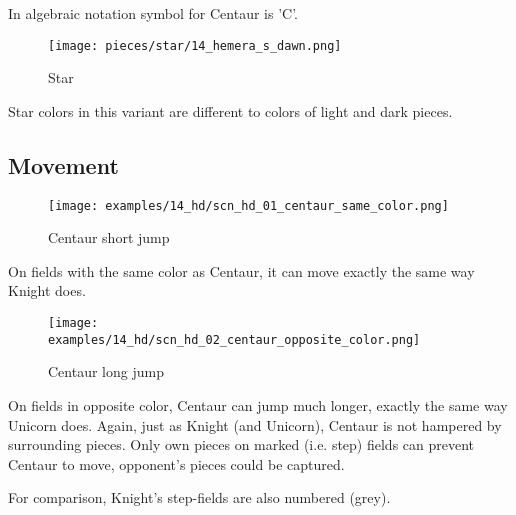 In algebraic notation symbol for Centaur is ’C’.

\noindent
\begin{wrapfigure}{l}{0.4\textwidth}
\centering
\texttt{[image: pieces/star/14\_hemera\_s\_dawn.png]}
\caption{Star}
\label{fig:star/14_hemera_s_dawn}
\end{wrapfigure}
Star colors in this variant are different to colors of light and dark pieces.

\clearpage %

\subsection*{Movement}

\noindent
\begin{wrapfigure}{l}{0.4\textwidth}
\centering
\texttt{[image: examples/14\_hd/scn\_hd\_01\_centaur\_same\_color.png]}
\caption{Centaur short jump}
\label{fig:scn_hd_01_centaur_same_color}
\end{wrapfigure}
On fields with the same color as Centaur, it can move exactly the
same way Knight does.

\clearpage %

\noindent
\begin{figure}[!h]
\texttt{[image: examples/14\_hd/scn\_hd\_02\_centaur\_opposite\_color.png]}
\caption{Centaur long jump}
\label{fig:scn_hd_02_centaur_opposite_color}
\end{figure}

On fields in opposite color, Centaur can jump much longer, exactly the
same way Unicorn does. Again, just as Knight (and Unicorn), Centaur is
not hampered by surrounding pieces. Only own pieces on marked (i.e. step)
fields can prevent Centaur to move, opponent's pieces could be captured.

For comparison, Knight's step-fields are also numbered (grey).

\clearpage %

